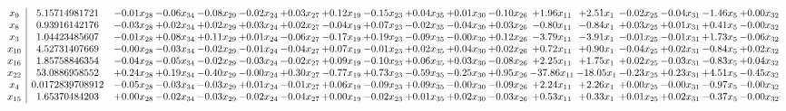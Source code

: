 \documentclass[9pt]{article}
\begin{document}
 \[\begin{array}{c| c c@{\hskip 2pt} c@{\hskip 2pt} c@{\hskip 2pt} c@{\hskip 2pt} c@{\hskip 2pt} c@{\hskip 2pt} c@{\hskip 2pt} c@{\hskip 2pt} c@{\hskip 2pt} c@{\hskip 2pt} c@{\hskip 2pt} c@{\hskip 2pt} c@{\hskip 2pt} c@{\hskip 2pt} c@{\hskip 2pt} c@{\hskip 2pt} }
 x_{9}   &  5.15714981721 & -0.01 x_{28} & -0.06 x_{34} & -0.08 x_{29} & -0.02 x_{24} & +  0.03 x_{27} & +  0.12 x_{19} & -0.15 x_{23} & +  0.04 x_{35} & +  0.01 x_{30} & -0.10 x_{26} & +  1.96 x_{11} & +  2.51 x_{1} & -0.02 x_{25} & -0.04 x_{31} & -1.46 x_{5} & +  0.00 x_{32}\\
 x_{8}   &  0.93916142176 & -0.03 x_{28} & +  0.02 x_{34} & +  0.02 x_{29} & +  0.03 x_{24} & +  0.02 x_{27} & -0.04 x_{19} & +  0.07 x_{23} & -0.02 x_{35} & -0.04 x_{30} & +  0.03 x_{26} & -0.80 x_{11} & -0.84 x_{1} & +  0.03 x_{25} & +  0.01 x_{31} & +  0.41 x_{5} & -0.00 x_{32}\\
 x_{3}   &  1.04423485607 & -0.01 x_{28} & +  0.08 x_{34} & +  0.11 x_{29} & +  0.01 x_{24} & -0.06 x_{27} & -0.17 x_{19} & +  0.19 x_{23} & -0.09 x_{35} & -0.00 x_{30} & +  0.12 x_{26} & -3.79 x_{11} & -3.91 x_{1} & -0.01 x_{25} & -0.01 x_{31} & +  1.73 x_{5} & -0.06 x_{32}\\
 x_{10}   &  4.52731407669 & -0.00 x_{28} & -0.03 x_{34} & -0.02 x_{29} & -0.01 x_{24} & -0.04 x_{27} & +  0.07 x_{19} & -0.01 x_{23} & +  0.02 x_{35} & +  0.04 x_{30} & +  0.02 x_{26} & +  0.72 x_{11} & +  0.90 x_{1} & -0.04 x_{25} & +  0.02 x_{31} & -0.84 x_{5} & +  0.02 x_{32}\\
 x_{16}   &  1.85758846354 & -0.04 x_{28} & -0.05 x_{34} & -0.02 x_{29} & -0.03 x_{24} & -0.02 x_{27} & +  0.09 x_{19} & -0.10 x_{23} & +  0.06 x_{35} & +  0.03 x_{30} & -0.08 x_{26} & +  2.25 x_{11} & +  1.75 x_{1} & +  0.02 x_{25} & -0.03 x_{31} & -0.83 x_{5} & +  0.04 x_{32}\\
 x_{22}   &  53.0886958552 & +  0.24 x_{28} & +  0.19 x_{34} & -0.40 x_{29} & -0.00 x_{24} & +  0.30 x_{27} & -0.77 x_{19} & +  0.73 x_{23} & -0.59 x_{35} & -0.25 x_{30} & +  0.95 x_{26} & -37.86 x_{11} & -18.05 x_{1} & -0.23 x_{25} & +  0.23 x_{31} & +  4.51 x_{5} & -0.45 x_{32}\\
 x_{4}   &  0.0172839708912 & -0.05 x_{28} & -0.03 x_{34} & -0.03 x_{29} & +  0.01 x_{24} & -0.01 x_{27} & +  0.06 x_{19} & -0.09 x_{23} & +  0.09 x_{35} & -0.00 x_{30} & -0.09 x_{26} & +  2.24 x_{11} & +  2.26 x_{1} & +  0.00 x_{25} & -0.00 x_{31} & -0.97 x_{5} & -0.00 x_{32}\\
 x_{15}   &  1.65370484203 & +  0.00 x_{28} & -0.02 x_{34} & -0.03 x_{29} & -0.02 x_{24} & -0.04 x_{27} & +  0.00 x_{19} & -0.02 x_{23} & +  0.01 x_{35} & +  0.02 x_{30} & -0.03 x_{26} & +  0.53 x_{11} & +  0.33 x_{1} & +  0.01 x_{25} & +  0.02 x_{31} & -0.37 x_{5} & -0.00 x_{32}\\

\end{array}\]
\end{document}
